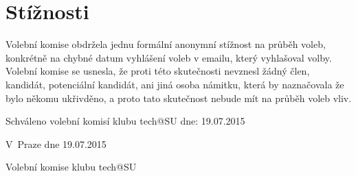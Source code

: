 \documentclass[10pt]{article}
\def \Datum {19.07.2015} %
\begin{document}
\section{Stížnosti}
	Volební komise obdržela jednu formální anonymní stížnost na průběh voleb, konkrétně na chybné datum vyhlášení voleb v emailu, který vyhlašoval volby.
	Volební komise se usnesla, že proti této skutečnosti nevznesl žádný člen, kandidát, potenciální kandidát, ani jiná osoba námitku, která by naznačovala že bylo někomu ukřivděno, a proto tato skutečnost nebude mít na průběh voleb vliv.

\vspace{10mm}

Schváleno volební komisí klubu tech@SU dne: \Datum

\vspace{30mm}

\hfill V~Praze dne \Datum

\hfill Volební komise klubu tech@SU
\end{document}
